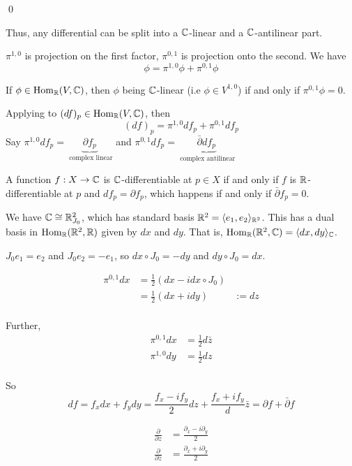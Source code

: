 \documentclass[x11names,reqno,14pt]{extarticle}
\begin{document}
\qed

Thus, any differential can be split into a $\mathbb{C}$-linear and a $\mathbb{C}$-antilinear part. 


$\pi^{1, 0}$ is projection on the first factor, $\pi^{0, 1}$ is projection onto the second. We have
\[
\phi = \pi^{1, 0}\phi + \pi^{0, 1}\phi
\]

\cor

If $\phi \in {\mathrm{Hom}}_{\mathbb{R}}(V,\mathbb{C})$, then $\phi$ being $\mathbb{C}$-linear (i.e $\phi \in V^{1, 0}$) if and only if $\pi^{0, 1}\phi = 0$. 


Applying to $(df)_p \in {\mathrm{Hom}}_{\mathbb{R}}(V, \mathbb{C})$, then 
\[
(df)_p = \pi^{1, 0}df_p + \pi^{0, 1}df_p
\]
Say $\pi^{1, 0}df_p = \underbrace{\partial f_p}_{\text{ complex linear}}$ and $\pi^{0, 1}df_p = \underbrace{\bar{\partial}df_p}_{\text{ complex antilinear}}$

\thm A function $f:X\to\mathbb{C}$ is $\mathbb{C}$-differentiable at $p \in X$ if and only if $f$ is $\mathbb{R}$-differentiable at $p$ and $df_p = \partial f_p$, which happens if and only if $\bar{\partial}f_p = 0$. 

\proof

We have $\mathbb{C} \cong \mathbb{R}^2_{J_0}$, which has standard basis $\mathbb{R}^2 = \langle e_1, e_2\rangle_{\mathbb{R}^2}$. This has a dual basis in ${\mathrm{Hom}}_{\mathbb{R}}(\mathbb{R}^2, \mathbb{R})$ given by $dx$ and $dy$. That is, ${\mathrm{Hom}}_{\mathbb{R}}(\mathbb{R}^2, \mathbb{C}) = \langle dx, dy \rangle_{\mathbb{C}}$. 

$J_0e_1 = e_2$ and $J_0e_2 = -e_1$, so $dx \circ J_0 = -dy$ and $dy \circ J_0 = dx$. 

\begin{align*}
\pi^{0, 1}dx & =\frac{1}{2}(dx - idx\circ J_0)\\
				 & = \frac{1}{2}(dx + idy) & := dz \\
\end{align*}

Further, 
\begin{align*}
\pi^{0, 1}dx & = \frac{1}{2}d\bar{z} \\
\pi^{1, 0}dy & = \frac{1}{2}dz \\
\end{align*}

So 
\[
df = f_xdx + f_ydy = \frac{f_x - if_y}{2}dz + \frac{f_x + if_y}d\bar{z} = \partial f + \bar{\partial} f
\]


\begin{align*}
\frac{\partial}{\partial z} & = \frac{\partial_x - i\partial_y}{2} \\
\frac{\partial}{\partial \bar{z}} & = \frac{\partial_x + i\partial_y}{2} \\
\end{align*}
\end{document}
